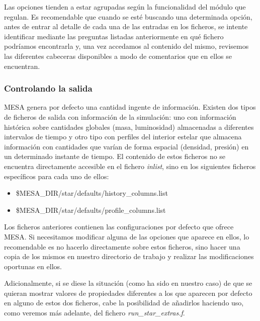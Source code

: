 Las opciones tienden a estar agrupadas según la funcionalidad del módulo que regulan. Es recomendable que cuando se esté buscando una determinada opción, antes de entrar al detalle de cada una de las entradas en los ficheros, se intente identificar mediante las preguntas listadas anteriormente en qué fichero podríamos encontrarla y, una vez accedamos al contenido del mismo, revisemos las diferentes cabeceras disponibles a modo de comentarios que en ellos se encuentran.\par

\subsubsection{Controlando la salida} \label{sec:ctrl_salida}
MESA genera por defecto una cantidad ingente de información. Existen dos tipos de ficheros de salida con información de la simulación: uno con información histórica sobre cantidades globales (masa, luminosidad) almacenadas a diferentes intervalos de tiempo y otro tipo con perfiles del interior estelar que almacena información con cantidades que varían de forma espacial (densidad, presión) en un determinado instante de tiempo. El contenido de estos ficheros no se encuentra directamente accesible en el fichero \textit{inlist}, sino en los siguientes ficheros específicos para cada uno de ellos:

\begin{itemize}
    \item \$MESA\_DIR/star/defaults/history\_columns.list
    \item \$MESA\_DIR/star/defaults/profile\_columns.list
\end{itemize}

Los ficheros anteriores contienen las configuraciones por defecto que ofrece MESA. Si necesitamos modificar alguna de las opciones que aparece en ellos, lo recomendable es no hacerlo directamente sobre estos ficheros, sino hacer una copia de los mismos en nuestro directorio de trabajo y realizar las modificaciones oportunas en ellos.\par

Adicionalmente, si se diese la situación (como ha sido en nuestro caso) de que se quieran mostrar valores de propiedades diferentes a los que aparecen por defecto en alguno de estos dos ficheros, cabe la posibilidad de añadirlos haciendo uso, como veremos más adelante, del fichero \textit{run\_star\_extras.f}.\par

